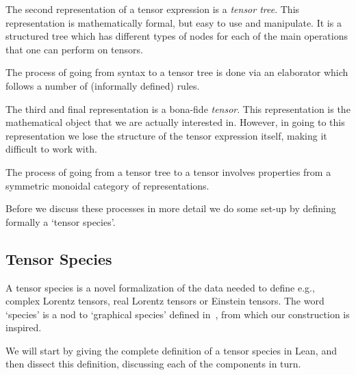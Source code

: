 \documentclass[a4paper, 11pt]{article}
\begin{document}
The second representation of a tensor expression is a \emph{tensor tree}. This representation is 
mathematically formal, but easy to use and manipulate. 
It is a structured tree which has different types 
of nodes for each of the main operations that one can perform on tensors.

The process of going from syntax to a tensor tree is done via an elaborator 
which follows a number of (informally defined) rules.

The third and final representation is a bona-fide \emph{tensor}. This representation 
is the mathematical object that we are actually interested in. However, in going to this representation
we lose the structure of the tensor expression itself, making it difficult to work with. 

The process of going from a tensor tree to a tensor involves properties from a symmetric monoidal 
category of representations. 

Before we discuss these processes in more detail we do some set-up by defining formally a 
`tensor species'. 

\subsection{Tensor Species}

A tensor species is a novel formalization of the data needed to define e.g., complex Lorentz tensors, 
real Lorentz tensors or Einstein tensors. The word `species' is a nod to `graphical species'
defined in~\cite{JOYAL2011105,raynor2021graphical}, from which our construction is inspired.

We will start by giving the complete definition of a tensor species in Lean, and then 
dissect this definition, discussing each of the components in turn. 
\end{document}
